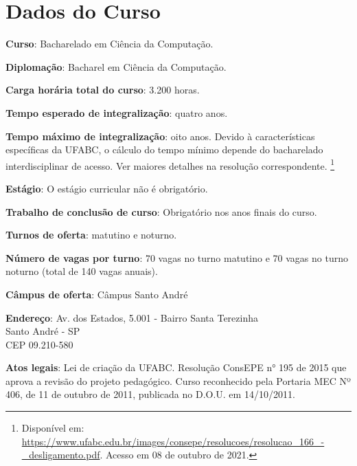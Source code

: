 \section {Dados do Curso}

\textbf{Curso}: Bacharelado em Ciência da Computação.

\textbf{Diplomação}: Bacharel em Ciência da Computação.

\textbf{Carga horária total do curso}: 3.200 horas.

\textbf{Tempo esperado de integralização}: quatro anos.  

\textbf{Tempo máximo de integralização}: oito anos. Devido à características específicas da UFABC, o cálculo do tempo mínimo depende do bacharelado interdisciplinar de acesso. Ver maiores detalhes na resolução correspondente. \footnote{Disponível em: \url{https://www.ufabc.edu.br/images/consepe/resolucoes/resolucao_166_-_desligamento.pdf}. Acesso em 08 de outubro de 2021.\label{note1}}

\textbf{Estágio}: O estágio curricular não é obrigatório.

\textbf{Trabalho de conclusão de curso}: Obrigatório nos anos finais do curso.

\textbf{Turnos de oferta}: matutino e noturno.

\textbf{Número de vagas por turno}: 70 vagas no turno matutino e 70 vagas no turno noturno (total de 140 vagas anuais).

\textbf{Câmpus de oferta}: Câmpus Santo André

\textbf{Endereço}: Av. dos Estados, 5.001 - Bairro Santa Terezinha\\
\hspace*{42pt}  Santo André - SP\\
\hspace*{42pt} CEP 09.210-580

\textbf{Atos legais}: Lei de criação da UFABC. Resolução ConsEPE n° 195 de 2015 que aprova a revisão do projeto pedagógico. Curso reconhecido pela Portaria MEC Nº 406, de 11 de outubro de 2011, publicada no D.O.U. em 14/10/2011. 
